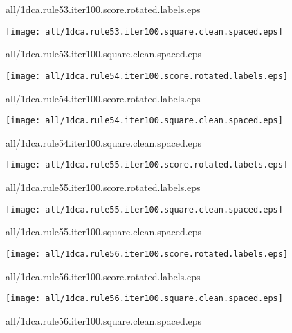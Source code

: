 \documentclass{article}
\begin{document}
{\footnotesize all/1dca.rule53.iter100.score.rotated.labels.eps}
\begin{center}
\begin{minipage}{\textwidth}
\texttt{[image: all/1dca.rule53.iter100.square.clean.spaced.eps]}
\end{minipage}
\end{center}
{\footnotesize all/1dca.rule53.iter100.square.clean.spaced.eps}
\begin{center}
\begin{minipage}{\textwidth}
\texttt{[image: all/1dca.rule54.iter100.score.rotated.labels.eps]}
\end{minipage}
\end{center}
{\footnotesize all/1dca.rule54.iter100.score.rotated.labels.eps}
\begin{center}
\begin{minipage}{\textwidth}
\texttt{[image: all/1dca.rule54.iter100.square.clean.spaced.eps]}
\end{minipage}
\end{center}
{\footnotesize all/1dca.rule54.iter100.square.clean.spaced.eps}
\begin{center}
\begin{minipage}{\textwidth}
\texttt{[image: all/1dca.rule55.iter100.score.rotated.labels.eps]}
\end{minipage}
\end{center}
{\footnotesize all/1dca.rule55.iter100.score.rotated.labels.eps}
\begin{center}
\begin{minipage}{\textwidth}
\texttt{[image: all/1dca.rule55.iter100.square.clean.spaced.eps]}
\end{minipage}
\end{center}
{\footnotesize all/1dca.rule55.iter100.square.clean.spaced.eps}
\begin{center}
\begin{minipage}{\textwidth}
\texttt{[image: all/1dca.rule56.iter100.score.rotated.labels.eps]}
\end{minipage}
\end{center}
{\footnotesize all/1dca.rule56.iter100.score.rotated.labels.eps}
\begin{center}
\begin{minipage}{\textwidth}
\texttt{[image: all/1dca.rule56.iter100.square.clean.spaced.eps]}
\end{minipage}
\end{center}
{\footnotesize all/1dca.rule56.iter100.square.clean.spaced.eps}
\end{document}
